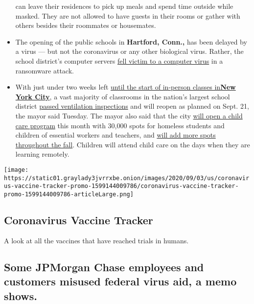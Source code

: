 \begin{itemize}
  can leave their residences to pick up meals and spend time outside
  while masked. They are not allowed to have guests in their rooms or
  gather with others besides their roommates or housemates.
\item
  The opening of the public schools in \textbf{Hartford, Conn.,} has
  been delayed by a virus --- but not the coronavirus or any other
  biological virus. Rather, the school district's computer servers
  \href{https://www.nytimes3xbfgragh.onion/2020/09/08/nyregion/hartford-schools-ransomware.html}{fell
  victim to a computer virus} in a ransomware attack.
\item
  With just under two weeks left
  \href{https://www.nytimes3xbfgragh.onion/2020/09/01/nyregion/schools-open-coronavirus-nyc.html}{until
  the start of in-person classes
  in}\textbf{\href{https://www.nytimes3xbfgragh.onion/2020/09/01/nyregion/schools-open-coronavirus-nyc.html}{New
  York City}}, a vast majority of classrooms in the nation's largest
  school district
  \href{https://twitter.com/elizashapiro/status/1303338482761371650}{passed
  ventilation inspections} and will reopen as planned on Sept. 21, the
  mayor said Tuesday. The mayor also said that the city
  \href{https://twitter.com/elizashapiro/status/1303339737399332866}{will
  open a child care program} this month with 30,000 spots for homeless
  students and children of essential workers and teachers, and
  \href{https://twitter.com/elizashapiro/status/1303339852700811264}{will
  add more spots throughout the fall}. Children will attend child care
  on the days when they are learning remotely.
\end{itemize}

\href{https://www.nytimes3xbfgragh.onion/interactive/2020/science/coronavirus-vaccine-tracker.html}{}

\texttt{[image: https://static01.graylady3jvrrxbe.onion/images/2020/09/03/us/coronavirus-vaccine-tracker-promo-1599144009786/coronavirus-vaccine-tracker-promo-1599144009786-articleLarge.png]}

\hypertarget{coronavirus-vaccine-tracker}{%
\subsection{Coronavirus Vaccine
Tracker}\label{coronavirus-vaccine-tracker}}

A look at all the vaccines that have reached trials in humans.

\hypertarget{some-jpmorgan-chase-employees-and-customers-misused-federal-virus-aid-a-memo-shows}{%
\subsection{Some JPMorgan Chase employees and customers misused federal
virus aid, a memo
shows.}\label{some-jpmorgan-chase-employees-and-customers-misused-federal-virus-aid-a-memo-shows}}

